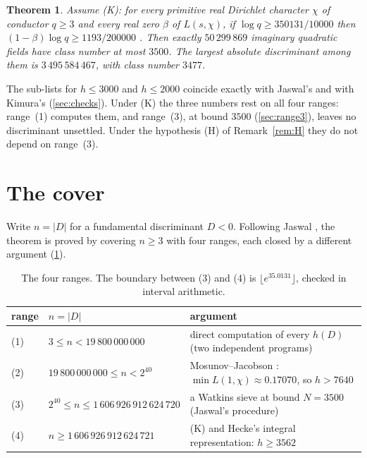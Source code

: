 \documentclass[11pt]{article}
\newtheorem{theorem}{Theorem}
\theoremstyle{definition}
\begin{document}
\begin{theorem}\label{thm:main}
Assume (K): for every primitive real Dirichlet character $\chi$ of conductor $q \ge 3$ and every real zero $\beta$ of
$L(s,\chi)$, if $\log q \ge 350131/10000$ then $(1-\beta)\log q \ge 1193/200000$ \cite[Theorem~1]{Kimura2026}. Then
exactly $50\,299\,869$ imaginary quadratic fields have class number at most $3500$. The largest absolute
discriminant among them is $3\,495\,584\,467$, with class number $3477$.
\end{theorem}

The sub-lists for $h \le 3000$ and $h \le 2000$ coincide exactly with Jaswal's and with Kimura's (\cref{sec:checks}).
Under (K) the three numbers rest on all four ranges: range~(1) computes them, and range~(3), at bound $3500$
(\cref{sec:range3}), leaves no discriminant unsettled. Under the hypothesis (H) of Remark~\ref{rem:H} they do not depend
on range~(3).

\section{The cover}\label{sec:cover}

Write $n = |D|$ for a fundamental discriminant $D < 0$. Following Jaswal \cite[\S2--3]{Jaswal2026}, the theorem is proved
by covering $n \ge 3$ with four ranges, each closed by a different argument (\cref{tab:cover}).

\begin{table}[h]
\centering\small
\begin{tabular}{@{}lll@{}}
\toprule
range & $n = |D|$ & argument \\
\midrule
(1) & $3 \le n < 19\,800\,000\,000$ & direct computation of every $h(D)$ (two independent programs)\\
(2) & $19\,800\,000\,000 \le n < 2^{40}$ & Mosunov--Jacobson \cite{MJ16}: $\min L(1,\chi) \approx 0.17070$, so $h > 7640$\\
(3) & $2^{40} \le n \le 1\,606\,926\,912\,624\,720$ & a Watkins sieve at bound $N = 3500$ (Jaswal's procedure)\\
(4) & $n \ge 1\,606\,926\,912\,624\,721$ & (K) and Hecke's integral representation: $h \ge 3562$\\
\bottomrule
\end{tabular}
\caption{The four ranges. The boundary between (3) and (4) is $\lfloor e^{35.0131}\rfloor$, checked in interval
arithmetic.}\label{tab:cover}
\end{table}
\end{document}
